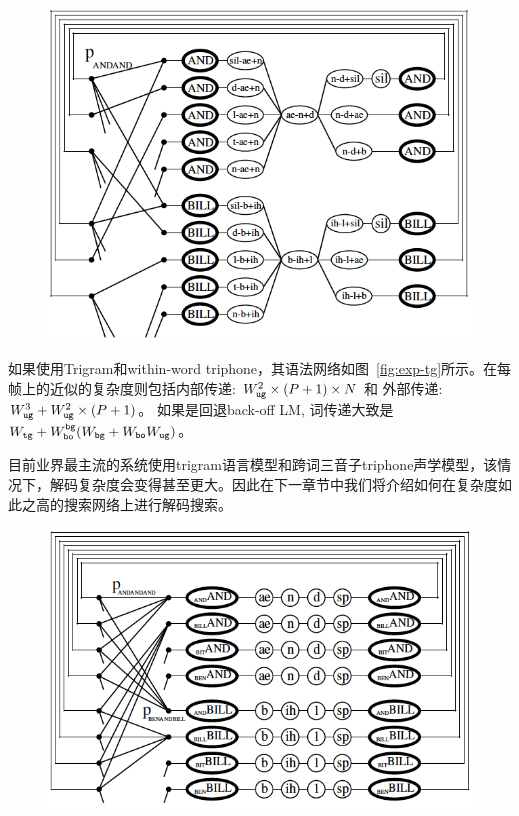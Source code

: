 \begin{figure}[!htp]
  \centering
    \captionstyle{\centering}
    \includegraphics[clip=true, width=\textwidth]{figure/xwrdbg.png}
\end{figure}

如果使用Trigram和within-word triphone，其语法网络如图~\ref{fig:exp-tg}所示。在每帧上的近似的复杂度则包括内部传递: $W_{\tt ug}^2\times (P+1)\times N$ 和 外部传递: $W_{\tt ug}^3 + W_{\tt ug}^2\times (P+1)$。
如果是回退back-off LM, 词传递大致是$W_{\tt tg}+W_{\tt bo}^{\tt bg}(W_{\tt bg}+W_{\tt bo}W_{\tt ug}) $。

目前业界最主流的系统使用trigram语言模型和跨词三音子triphone声学模型，该情况下，解码复杂度会变得甚至更大。因此在下一章节中我们将介绍如何在复杂度如此之高的搜索网络上进行解码搜索。

\begin{figure}[!htp]
  \centering
    \captionstyle{\centering}
    \includegraphics[clip=true, width=\textwidth]{figure/tg.png}
\end{figure}

